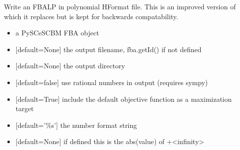 \documentclass[letterpaper,10pt,english]{sphinxmanual}
\begin{document}
\begin{fulllineitems}
\label{\detokenize{modules_doc:cbmpy.CBWrite.writeStoichiometricMatrix}}
\pysigstartsignatures
{}
\pysigstopsignatures
\sphinxAtStartPar
Write an FBA\sphinxhyphen{}LP in polynomial H\sphinxhyphen{}Format file. This is an improved version of 
which it replaces but is kept for backwards compatability.
\begin{itemize}
\item {} 
\sphinxAtStartPar
{} a PySCeS\sphinxhyphen{}CBM FBA object

\item {} 
\sphinxAtStartPar
{} {[}default=None{]} the output filename, fba.getId() if not defined

\item {} 
\sphinxAtStartPar
{} {[}default=None{]} the output directory

\item {} 
\sphinxAtStartPar
{} {[}default=false{]} use rational numbers in output (requires sympy)

\item {} 
\sphinxAtStartPar
{} {[}default=True{]} include the default objective function as a maximization target

\item {} 
\sphinxAtStartPar
{} {[}default=’\%s’{]} the number format string

\item {} 
\sphinxAtStartPar
{} {[}default=None{]} if defined this is the abs(value) of +\sphinxhyphen{}\textless{}infinity\textgreater{}

\end{itemize}

\end{fulllineitems}
\end{document}

